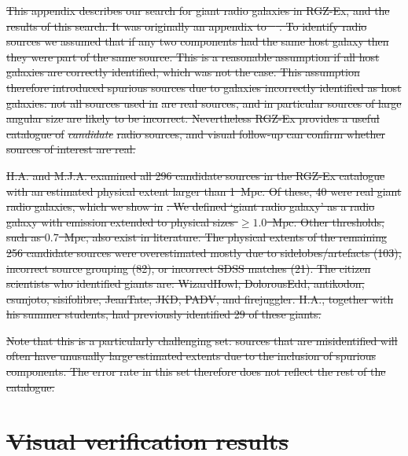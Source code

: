 \documentclass[11pt, a4paper]{book}
\providecommand{\DIFdeltex}[1]{{\protect\color{red}\sout{#1}}}                      %
\providecommand{\DIFdel}[1]{\texorpdfstring{\DIFdeltex{#1}}{}} %
\begin{document}
\DIFdel{This appendix describes our search for giant radio galaxies in RGZ-Ex, and the results of this search. It was originally an appendix to \mbox{%
\citet{alger21rlfs}}\hspace{0pt}%
. To identify radio sources we assumed that if any two components had the same host galaxy then they were part of the same source. This is a reasonable assumption if all host galaxies are correctly identified, which was not the case. This assumption therefore introduced spurious sources due to galaxies incorrectly identified as host galaxies: not all sources used in }%
\DIFdel{are real sources, and in particular sources of large angular size are likely to be incorrect. Nevertheless RGZ-Ex provides a useful catalogue of }\emph{\DIFdel{candidate}} %
\DIFdel{radio sources, and visual follow-up can confirm whether sources of interest are real.
}%

\DIFdel{H.A. and M.J.A. examined all 296 candidate sources in the RGZ-Ex catalogue with an estimated physical extent larger than 1~Mpc. Of these, 40 were real giant radio galaxies, which we show in }%
\DIFdel{. We defined `giant radio galaxy' as a radio galaxy with emission extended to physical sizes $\geq 1.0$~Mpc. Other thresholds, such as $0.7$~Mpc, also exist in literature. The physical extents of the remaining 256 candidate sources were overestimated
mostly due to sidelobes/artefacts (103), incorrect source grouping (82), or incorrect SDSS matches (21). The citizen scientists who identified giants are: WizardHowl, DolorousEdd, antikodon, csunjoto, sisifolibre, JeanTate, JKD, PADV, and firejuggler. H.A., together with his summer students, had previously identified 29 of these giants.
}%

\DIFdel{Note that this is a particularly challenging set: sources that are misidentified will often have unusually large estimated extents due to the inclusion of spurious components. The error rate in this set therefore does not reflect the rest of the catalogue.
}%

\section{\DIFdel{Visual verification results}}
\addtocounter{section}{-1}%
\end{document}
